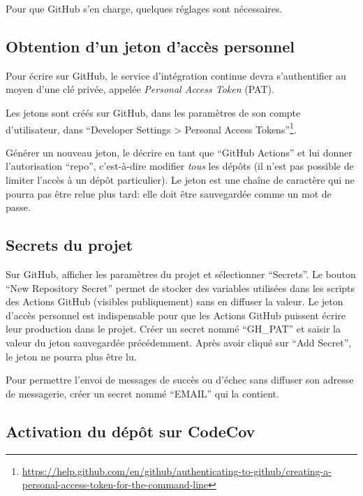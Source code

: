\documentclass[
  12pt,
  french,
  a4paper,
  extrafontsizes,onecolumn,openright
  ]{memoir}
\begin{document}
Pour que GitHub s'en charge, quelques réglages sont nécessaires.

\hypertarget{sec:pat}{%
\subsection{Obtention d'un jeton d'accès personnel}\label{sec:pat}}

Pour écrire sur GitHub, le service d'intégration continue devra s'authentifier au moyen d'une clé privée, appelée \emph{Personal Access Token} (PAT).

Les jetons sont créés sur GitHub, dans les paramètres de son compte d'utilisateur, dans \enquote{Developer Settings \textgreater{} Personal Access Tokens}\footnote{\url{https://help.github.com/en/github/authenticating-to-github/creating-a-personal-access-token-for-the-command-line}}.

Générer un nouveau jeton, le décrire en tant que \enquote{GitHub Actions} et lui donner l'autorisation \enquote{repo}, c'est-à-dire modifier \emph{tous} les dépôts (il n'est pas possible de limiter l'accès à un dépôt particulier).
Le jeton est une chaîne de caractère qui ne pourra pas être relue plus tard: elle doit être sauvegardée comme un mot de passe.

\hypertarget{sec:secrets-ci}{%
\subsection{Secrets du projet}\label{sec:secrets-ci}}

Sur GitHub, afficher les paramètres du projet et sélectionner \enquote{Secrets}.
Le bouton \enquote{New Repository Secret} permet de stocker des variables utilisées dans les scripts des Actions GitHub (visibles publiquement) sans en diffuser la valeur.
Le jeton d'accès personnel est indispensable pour que les Actions GitHub puissent écrire leur production dans le projet.
Créer un secret nommé \enquote{GH\_PAT} et saisir la valeur du jeton sauvegardée précédemment.
Après avoir cliqué sur \enquote{Add Secret}, le jeton ne pourra plus être lu.

Pour permettre l'envoi de messages de succès ou d'échec sans diffuser son adresse de messagerie, créer un secret nommé \enquote{EMAIL} qui la contient.

\hypertarget{activation-du-duxe9puxf4t-sur-codecov}{%
\subsection{Activation du dépôt sur CodeCov}\label{activation-du-duxe9puxf4t-sur-codecov}}
\end{document}

